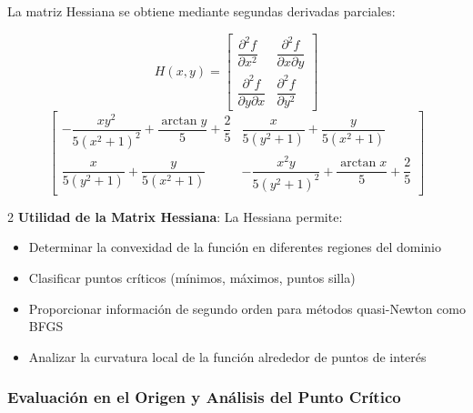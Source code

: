 \documentclass[11pt, a4paper, twocolumn]{beamer}
\begin{document}
 La matriz Hessiana se obtiene mediante segundas derivadas parciales:
 {
 	
 \begin{equation}
 	H(x,y) = \begin{bmatrix}
 		\dfrac{\partial^2 f}{\partial x^2} & \dfrac{\partial^2 f}{\partial x \partial y} \\[0.5em]
 		\dfrac{\partial^2 f}{\partial y \partial x} & \dfrac{\partial^2 f}{\partial y^2}
 	\end{bmatrix} 
 \end{equation}
 \begin{equation}
 	 \begin{bmatrix}
 		-\dfrac{x y^2}{5(x^2 + 1)^2} + \dfrac{\arctan y}{5} + \dfrac{2}{5} & \dfrac{x}{5(y^2 + 1)} + \dfrac{y}{5(x^2 + 1)} \\[1em]
 		\dfrac{x}{5(y^2 + 1)} + \dfrac{y}{5(x^2 + 1)} & -\dfrac{x^2 y}{5(y^2 + 1)^2} + \dfrac{\arctan x}{5} + \dfrac{2}{5}
 	\end{bmatrix}
 \end{equation}
\newpage
}
 \begin{multicols}{2}
 \textbf{Utilidad de la Matrix Hessiana}: La Hessiana permite:
 \begin{itemize}
 	\item Determinar la convexidad de la función en diferentes regiones del dominio
 	\item Clasificar puntos críticos (mínimos, máximos, puntos silla)
 	\item Proporcionar información de segundo orden para métodos quasi-Newton como BFGS
 	\item Analizar la curvatura local de la función alrededor de puntos de interés
 \end{itemize}
 \newpage
 \end{multicols}

 \subsubsection{Evaluación en el Origen y Análisis del Punto Crítico}
 
\end{document}
